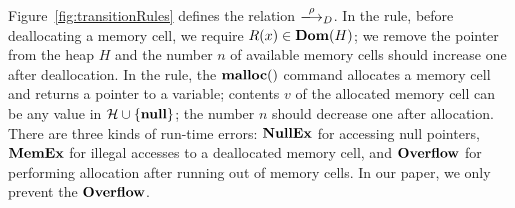   Figure~\ref{fig:transitionRules}
defines the relation \(\xlongrightarrow{\rho}_D\). In the 
rule, before deallocating a memory cell, we require \(R(x) \in
\mathbf{Dom}(H)\); we remove the pointer from the heap \(H\) and the number
\(n\) of available memory cells should increase one after
deallocation.  In the  rule, the \(\mathbf{malloc}()\) command
allocates a memory cell and returns a pointer to a variable; contents
\(v\) of the allocated memory cell can be any value in \(\mathcal{H}
\cup \{\mathbf{null}\}\); the number \(n\) should decrease one after
allocation.  There are three kinds of run-time errors: \(\bf NullEx\)
for accessing null pointers, \(\bf MemEx\) for illegal accesses to a
deallocated memory cell, and \(\bf Overflow\) for performing
allocation after running out of memory cells. In our paper, we only
prevent the \(\bf Overflow\).


